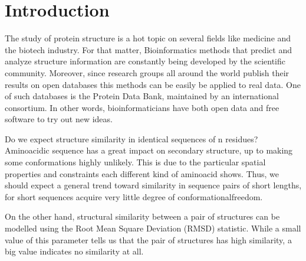 \documentclass[a4paper, 11pt]{article} %
\begin{document}
\newpage

\setcounter{figure}{0}
\renewcommand\thefigure{\arabic{figure}}
%
\setcounter{table}{0}
\renewcommand\thetable{\arabic{table}}

\thispagestyle{empty}
\tableofcontents
\thispagestyle{empty}

\newpage




\setcounter{page}{1}
\section{Introduction}

The study of protein structure is a hot topic on several fields like medicine and the biotech industry. For that matter, Bioinformatics methods that predict and analyze structure information are constantly being developed by the scientific community. Moreover, since research groups all around the world publish their results on open databases this methods can be easily be applied to real data. One of such databases is the Protein Data Bank, maintained by an international consortium. In other words, bioinformaticians have both open data and free software to try out new ideas.


Do we expect structure similarity in identical sequences of n residues? Aminoacidic sequence has a great impact on secondary structure, up to making some conformations highly unlikely. This is due to the particular spatial properties and constraints each different kind of aminoacid shows. Thus, we should expect a general trend toward similarity in sequence pairs of short lengths, for short sequences acquire very little degree of \textquotesingle conformational\textquotesingle freedom.

On the other hand, structural similarity between a pair of structures can be modelled using the Root Mean Square Deviation (RMSD) statistic. While a small value of this parameter tells us that the pair of structures has high similarity, a big value indicates no similarity at all.
\end{document}
